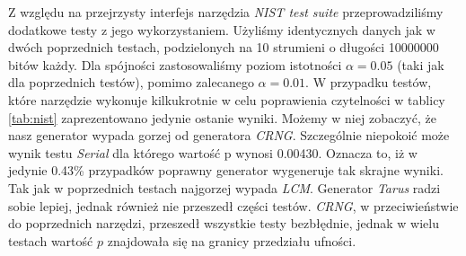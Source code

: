 Z względu na przejrzysty interfejs narzędzia \emph{NIST test suite} \cite{NISTTests} przeprowadziliśmy dodatkowe testy z jego wykorzystaniem. Użyliśmy identycznych danych jak w dwóch poprzednich testach, podzielonych na 10 strumieni o długości 10000000 bitów każdy.  Dla spójności zastosowaliśmy poziom istotności $\alpha = 0.05$ (taki jak dla poprzednich testów), pomimo zalecanego $\alpha = 0.01$. W przypadku testów, które narzędzie wykonuje kilkukrotnie w celu poprawienia czytelności w tablicy \ref{tab:nist} zaprezentowano jedynie ostanie wyniki. Możemy w niej zobaczyć, że nasz generator wypada gorzej od generatora \emph{CRNG}. Szczególnie niepokoić może wynik testu \emph{Serial} dla którego wartość p wynosi 0.00430. Oznacza to, iż w jedynie 0.43\% przypadków poprawny generator wygeneruje tak skrajne wyniki. Tak jak w poprzednich testach najgorzej wypada \emph{LCM}. Generator \emph{Tarus} radzi sobie lepiej, jednak również nie przeszedł części testów. \emph{CRNG}, w przeciwieństwie do poprzednich narzędzi, przeszedł wszystkie testy bezbłędnie, jednak w wielu testach wartość $p$ znajdowała się na granicy przedziału ufności.